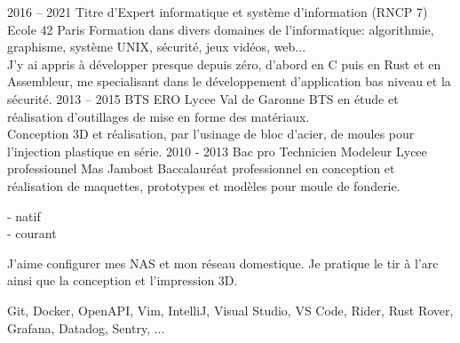 \documentclass[8pt]{developercv} %
\begin{document}
\begin{entrylist}
	\entry
		{2016 -- 2021}
		{Titre d'Expert informatique et système d'information (RNCP 7)}
		{Ecole 42 Paris}
		{
			Formation dans divers domaines de l'informatique: algorithmie, graphisme, système UNIX, sécurité, jeux vidéos, web...\\
			J'y ai appris à développer presque depuis zéro, d'abord en C puis en Rust et en Assembleur, me specialisant dans le développement d'application bas niveau et la sécurité.
		}
	\entry
		{2013 -- 2015}
		{BTS ERO}
		{Lycee Val de Garonne}
		{
			BTS en étude et réalisation d'outillages de mise en forme des matériaux.\\
			Conception 3D et réalisation, par l'usinage de bloc d'acier, de moules pour l'injection plastique en série.
		}
	\entry
		{2010 - 2013}
		{Bac pro Technicien Modeleur}
		{Lycee professionnel Mas Jambost}
		{
			Baccalauréat professionnel en conception et réalisation de maquettes, prototypes et modèles pour moule de fonderie.
		}
\end{entrylist}

\vfill %
\begin{minipage}[t]{0.2\textwidth} %
	\vspace{-\baselineskip} %


	 - natif\\
	 - courant\\
\end{minipage}
\hfill
\begin{minipage}[t]{0.35\textwidth} %
	\vspace{-\baselineskip} %


	J'aime configurer mes NAS et mon réseau domestique. Je pratique le tir à l'arc ainsi que la conception et l'impression 3D.
\end{minipage}
\hfill
\begin{minipage}[t]{0.35\textwidth} %
	\vspace{-\baselineskip} %


	Git, Docker, OpenAPI, Vim, IntelliJ, Visual Studio, VS Code, Rider, Rust Rover, Grafana, Datadog, Sentry, ...
\end{minipage}
\vspace{\baselineskip}
\end{document}
